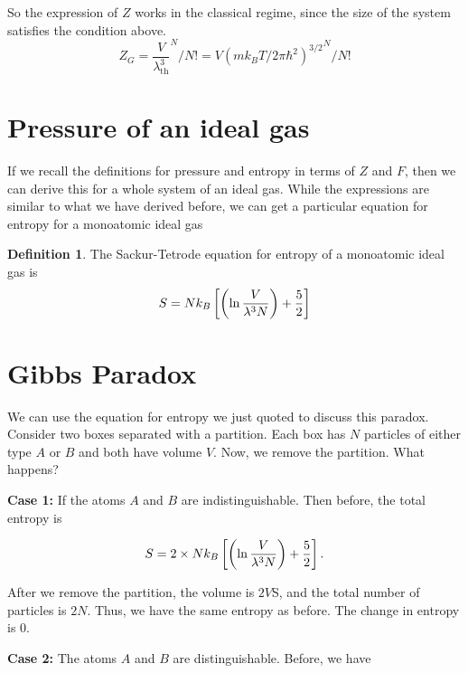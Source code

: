 \documentclass[12pt,chapterprefix=false,dvipsnames]{scrbook}
\theoremstyle{dotless}
\theoremstyle{definition}
\newtheorem{protodefinition}{Definition}[section]
\newenvironment{definition}
{\colorlet{shadecolor}{black!15}\begin{shaded}\begin{protodefinition}}
			{\end{protodefinition}\end{shaded}}
\begin{document}
So the expression of $Z$ works in the
classical regime, since the size of the system satisfies the
condition above.
\begin{equation}
	Z_G = {\frac{V}{\lambda^3_\mathrm{th}}}^N / N! =
	{V {\left(m k_B T / 2\pi \hbar^2\right)}^{3/2} }^N / N!
\end{equation}

\section{Pressure of an ideal gas}%
\label{sec:pressure_of_an_ideal_gas}

If we recall the definitions for pressure and entropy in terms
of $Z$ and $F$, then we
can derive this for a whole system of an ideal gas. While the
expressions are similar to what we have derived before, we can
get a particular equation for entropy for a monoatomic ideal gas

\begin{definition}
	The Sackur-Tetrode equation for entropy of a monoatomic ideal
	gas is
	\begin{equation}
		S = N k_B \left[ \left(\naturallogarithm{\frac{V}{\lambda^3 N}}\right) + \frac{5}{2} \right]
	\end{equation}
\end{definition}

\section{Gibbs Paradox}%
\label{sec:gibbs_paradox}

We can use the equation for entropy we just quoted to discuss
this paradox. Consider two boxes separated with a partition.
Each box has $N$ particles of either type
$A$ or $B$ and both have
volume $V$. Now, we remove the partition.
What happens?

\textbf{Case 1:} If the atoms $A$
and $B$ are indistinguishable. Then before,
the total entropy is

\begin{equation}
	S = 2 \times N k_B \left[
		\left(\naturallogarithm{\frac{V}{\lambda^3 N}}\right) + \frac{5}{2}\right].
\end{equation}

After we remove the partition, the volume is
$2 V$S, and the total number of particles is
$2 N$. Thus, we have the same entropy as
before. The change in entropy is 0.

\textbf{Case 2:} The atoms $A$ and
$B$ are distinguishable. Before, we have
\end{document}
